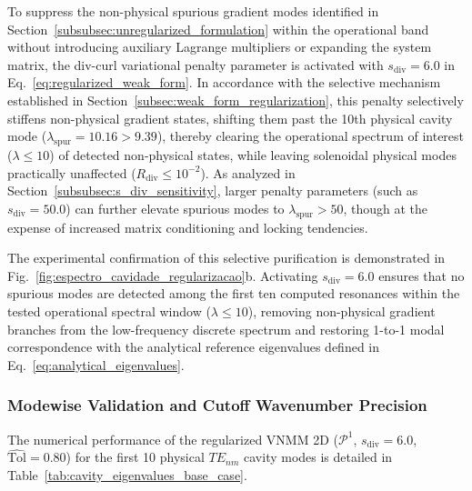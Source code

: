\documentclass[preprint,12pt]{elsarticle}
\begin{document}
To suppress the non-physical spurious gradient modes identified in Section~\ref{subsubsec:unregularized_formulation} within the operational band without introducing auxiliary Lagrange multipliers or expanding the system matrix, the div-curl variational penalty parameter is activated with $s_{\mathrm{div}} = 6.0$ in Eq.~\eqref{eq:regularized_weak_form}. In accordance with the selective mechanism established in Section~\ref{subsec:weak_form_regularization}, this penalty selectively stiffens non-physical gradient states, shifting them past the 10th physical cavity mode ($\lambda_{\mathrm{spur}} = 10.16 > 9.39$), thereby clearing the operational spectrum of interest ($\lambda \le 10$) of detected non-physical states, while leaving solenoidal physical modes practically unaffected ($R_{\mathrm{div}} \le 10^{-2}$). As analyzed in Section~\ref{subsubsec:s_div_sensitivity}, larger penalty parameters (such as $s_{\mathrm{div}} = 50.0$) can further elevate spurious modes to $\lambda_{\mathrm{spur}} > 50$, though at the expense of increased matrix conditioning and locking tendencies.

The experimental confirmation of this selective purification is demonstrated in Fig.~\ref{fig:espectro_cavidade_regularizacao}b. Activating $s_{\mathrm{div}} = 6.0$ ensures that no spurious modes are detected among the first ten computed resonances within the tested operational spectral window ($\lambda \le 10$), removing non-physical gradient branches from the low-frequency discrete spectrum and restoring 1-to-1 modal correspondence with the analytical reference eigenvalues defined in Eq.~\eqref{eq:analytical_eigenvalues}.

\subsubsection{Modewise Validation and Cutoff Wavenumber Precision}
\label{subsubsec:modewise_validation}

The numerical performance of the regularized VNMM 2D ($\mathcal{P}^1$, $s_{\mathrm{div}} = 6.0$, $\widehat{\mathrm{Tol}} = 0.80$) for the first 10 physical $TE_{nm}$ cavity modes is detailed in Table~\ref{tab:cavity_eigenvalues_base_case}.
\end{document}
